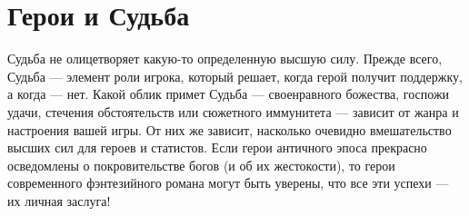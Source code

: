\section{Герои и Судьба}
Судьба не олицетворяет какую-то определенную высшую силу. Прежде всего, Судьба — элемент роли игрока, который решает, когда герой получит поддержку, а когда — нет. Какой облик примет Судьба — своенравного божества, госпожи удачи, стечения обстоятельств или сюжетного иммунитета — зависит от жанра и настроения вашей игры. От них же зависит, насколько очевидно вмешательство высших сил для героев и статистов. Если герои античного эпоса прекрасно осведомлены о покровительстве богов (и об их жестокости), то герои современного фэнтезийного романа могут быть уверены, что все эти успехи — их личная заслуга!